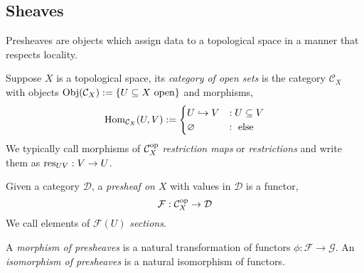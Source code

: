 \documentclass[000-main.tex]{subfiles}
\begin{document}
\subsection{Sheaves}%
\label{sec:sheaves}

Presheaves are objects which assign data to a topological space in a manner that respects locality.
\begin{definition}
  Suppose $X$ is a topological space, its \emph{category of open sets} is the category $\mathcal{C}_X$ with objects $\operatorname{Obj}(\mathcal{C}_X) := \{U \subseteq X \text{ open}\}$ and morphisms,
  \begin{displaymath}
    \operatorname{Hom}_{\mathcal{C}_X}(U, V) :=
    \begin{cases}
      U \hookrightarrow V &: U \subseteq V\\
      \varnothing &: \text{ else}
    \end{cases}
  \end{displaymath}
  We typically call morphisms of $\mathcal{C}_X^{\text{op}}$ \emph{restriction maps} or \emph{restrictions} and write them as $\operatorname{res}_{UV}: V\to U$.

  Given a category $\mathcal{D}$, a \emph{presheaf on $X$} with values in $\mathcal{D}$ is a functor,
  \begin{displaymath}
    \mathcal{F}: \mathcal{C}_X^{\text{op}} \to \mathcal{D}
  \end{displaymath}
  We call elements of $\mathcal{F}(U)$ \emph{sections}.

  A \emph{morphism of presheaves} is a natural transformation of functors $\phi: \mathcal{F}\to \mathcal{G}$.
  An \emph{isomorphism of presheaves} is a natural isomorphism of functors.
\end{definition}
\end{document}
